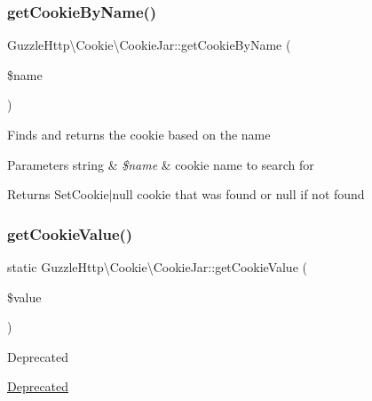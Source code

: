 \subsubsection{\texorpdfstring{get\+Cookie\+By\+Name()}{getCookieByName()}}
{\footnotesize\ttfamily Guzzle\+Http\textbackslash{}\+Cookie\textbackslash{}\+Cookie\+Jar\+::get\+Cookie\+By\+Name (\begin{DoxyParamCaption}\item[{}]{\$name }\end{DoxyParamCaption})}

Finds and returns the cookie based on the name


\begin{DoxyParams}[1]{Parameters}
string & {\em \$name} & cookie name to search for \\
\hline
\end{DoxyParams}
\begin{DoxyReturn}{Returns}
Set\+Cookie$\vert$null cookie that was found or null if not found 
\end{DoxyReturn}
\mbox{\label{classGuzzleHttp_1_1Cookie_1_1CookieJar_a6774ce1a8f02306aef22ce72db15921b}} 
\subsubsection{\texorpdfstring{get\+Cookie\+Value()}{getCookieValue()}}
{\footnotesize\ttfamily static Guzzle\+Http\textbackslash{}\+Cookie\textbackslash{}\+Cookie\+Jar\+::get\+Cookie\+Value (\begin{DoxyParamCaption}\item[{}]{\$value }\end{DoxyParamCaption})\hspace{0.3cm}{\ttfamily [static]}}

\begin{DoxyRefDesc}{Deprecated}
\item[\hyperlink{deprecated__deprecated000001}{Deprecated}]\end{DoxyRefDesc}
\mbox{\label{classGuzzleHttp_1_1Cookie_1_1CookieJar_aad8a1f58451d3b8305793c16923bf511}} 

